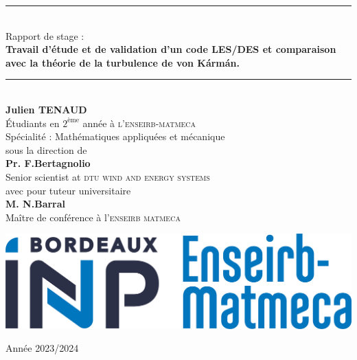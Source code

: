 \documentclass[12pt]{article}
\theoremstyle{plain}
\theoremstyle{remark}
\begin{document}
	
	
	
	\hypersetup{pdfborder=0 0 0}
	\begin{titlepage}
		\newcommand{\HRule}{\rule{\linewidth}{0.5mm}}
		\begin{center}
			
			
			
			\vspace{1cm}
			
			\HRule \\ [0.8cm]
			{\Large {Rapport de stage :} }\\ [0.8cm]
			{\huge \bf Travail d'étude et de validation d'un code LES/DES et comparaison avec la théorie de la turbulence de von Kármán.} \\ [0.4cm]
			\HRule \\ [2cm]
			{\large \textbf{Julien TENAUD}} \\ [0.3cm]
			{ Étudiants en $2^{\text{ème}}$ année à \textsc{l'enseirb-matmeca}} \\ [0.2cm]
			{ Spécialité : Mathématiques appliquées et mécanique} \\ [1cm]
			{\small sous la direction de }\\ [0.6cm]
			{\large \textbf{Pr. F.Bertagnolio}} \\ [0.3cm]
			{ Senior scientist at \textsc{dtu wind and energy systems}} \\ [1cm]
			{\small avec pour tuteur universitaire }\\ [0.6cm]
			{\large \textbf{M. N.Barral}} \\ [0.3cm]
			{ Maître de conférence à l'\textsc{enseirb matmeca}}\\ [0.3cm]
			
			\vfill
			
			\begin{minipage}[c]{.4\textwidth}
				\begin{center}
					\includegraphics[width=1\textwidth]{logo_emkk.jpg}
				\end{center}
			\end{minipage}
			
			\vfill
			
			
			{Année 2023/2024}
			
			
		\end{center}
	\end{titlepage}
	
\end{document}
